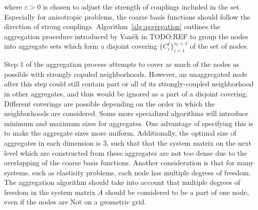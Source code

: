 where $\varepsilon > 0$ is chosen to adjust the strength of couplings included in the set. Especially for anisotropic problems, the coarse basis functions should follow the direction of strong couplings. Algorithm~\ref{alg:aggregation} outlines the aggregation procedure introduced by Van\u{e}k in TODO:REF to group the nodes into aggregate sets which form a disjoint covering $\{C_i^\ell\}_{i=1}^{n_\ell + 1}$ of the set of nodes.

Step 1 of the aggregation process attempts to cover as much of the nodes as possible with strongly copuled neighborhoods. However, an unaggregated node after this step could still contain part or all of its strongly-coupled neighborhood in other aggregates, and thus would be ignored as a part of a disjoint covering. Different coverings are possible depending on the order in which the neighborhoods are considered. Some more specialized algorithms will introduce minimum and maximum sizes for aggregates. One advantage of specifying this is to make the aggregate sizes more uniform. Additionally, the optimal size of aggregates in each dimension is 3, such that that the system matrix on the next level which are constructed from these aggregates are not too dense due to the overlapping of the coarse basis functions. Another consideration is that for many systems, such as elastisity problems, each node has multiple degrees of freedom. The aggregation algorithm should take into account that multiple degrees of freedom in the system matrix $A$ should be considered to be a part of one node, even if the nodes are Not on a geometric grid.

